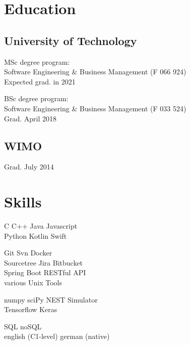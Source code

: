 \documentclass[]{resume}
\begin{document}
\begin{minipage}[t]{0.33\textwidth} 
\section{Education} 

	\subsection{University of Technology}
		MSc degree program: \\
		Software Engineering \& Business Management (F 066 924)\\
		Expected grad. in 2021
		\sectionsep

		BSc degree program: \\
		Software Engineering \& Business Management (F 033 524)\\
		Grad. April 2018
	\sectionsep

	\subsection{WIMO}
		Grad. July 2014
	\sectionsep

\section{Skills}
	C \textbullet{} C++ \textbullet{} Java \textbullet{} Javascript \\ Python \textbullet{} Kotlin \textbullet{} Swift \\ \sectionsep 
	
	Git \textbullet{} Svn \textbullet{} Docker \\ Sourcetree \textbullet{} Jira \textbullet{} Bitbucket \\ Spring Boot \textbullet{} RESTful API \\
	various Unix Tools \\ \sectionsep 
	
	numpy \textbullet{} sciPy \textbullet{} NEST Simulator \\ 
	Tensorflow  \textbullet{} Keras \\\sectionsep 
	
	SQL \textbullet{} noSQL\\ \sectionsep 
	english (C1-level) \textbullet{} german (native)
	
\end{minipage}\quad %
\end{document}
